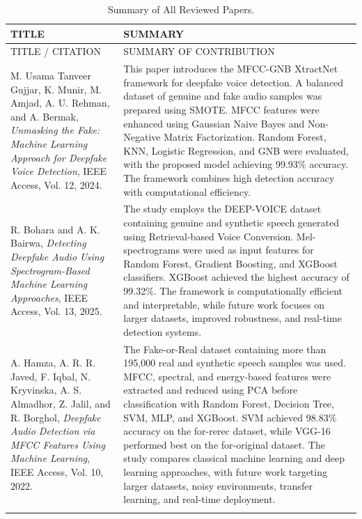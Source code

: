 \documentclass[12pt,a4paper]{report}
\begin{document}
\begin{longtable}{|p{5cm}|p{9cm}|}

\hline
TITLE & SUMMARY\\ \hline
\endfirsthead

\hline
TITLE / CITATION & SUMMARY OF CONTRIBUTION \\ \hline
\endhead

M. Usama Tanveer Gujjar, K. Munir, M. Amjad, A. U. Rehman, and A. Bermak, \textit{Unmasking the Fake: Machine Learning Approach for Deepfake Voice Detection}, IEEE Access, Vol. 12, 2024.
&
This paper introduces the MFCC-GNB XtractNet framework for deepfake voice detection. A balanced dataset of genuine and fake audio samples was prepared using SMOTE. MFCC features were enhanced using Gaussian Naive Bayes and Non-Negative Matrix Factorization. Random Forest, KNN, Logistic Regression, and GNB were evaluated, with the proposed model achieving 99.93\% accuracy. The framework combines high detection accuracy with computational efficiency. \\ \hline

R. Bohara and A. K. Bairwa, \textit{Detecting Deepfake Audio Using Spectrogram-Based Machine Learning Approaches}, IEEE Access, Vol. 13, 2025.
&
The study employs the DEEP-VOICE dataset containing genuine and synthetic speech generated using Retrieval-based Voice Conversion. Mel-spectrograms were used as input features for Random Forest, Gradient Boosting, and XGBoost classifiers. XGBoost achieved the highest accuracy of 99.32\%. The framework is computationally efficient and interpretable, while future work focuses on larger datasets, improved robustness, and real-time detection systems. \\ \hline

A. Hamza, A. R. R. Javed, F. Iqbal, N. Kryvinska, A. S. Almadhor, Z. Jalil, and R. Borghol, \textit{Deepfake Audio Detection via MFCC Features Using Machine Learning}, IEEE Access, Vol. 10, 2022.
&
The Fake-or-Real dataset containing more than 195,000 real and synthetic speech samples was used. MFCC, spectral, and energy-based features were extracted and reduced using PCA before classification with Random Forest, Decision Tree, SVM, MLP, and XGBoost. SVM achieved 98.83\% accuracy on the for-rerec dataset, while VGG-16 performed best on the for-original dataset. The study compares classical machine learning and deep learning approaches, with future work targeting larger datasets, noisy environments, transfer learning, and real-time deployment. \\ \hline

\caption[Summary of All Reviewed Papers]{Summary of All Reviewed Papers.}
\label{tab:litreview}

\end{longtable}
\end{document}
